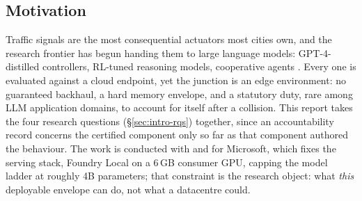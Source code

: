 \subsection{Motivation}\label{sec:intro-motivation}
Traffic signals are the most consequential actuators most cities own, and
the research frontier has begun handing them to large language models:
GPT-4-distilled controllers, RL-tuned reasoning models, cooperative agents
\cite{lai2023llmlight,wang2025trafficr1,collmlight2025}. Every one is
evaluated against a cloud endpoint, yet the junction is an edge
environment: no guaranteed backhaul, a hard memory envelope, and a
statutory duty, rare among LLM application domains, to account for itself
after a collision. This report takes the four research questions
(\S\ref{sec:intro-rqs}) together, since an accountability record concerns
the certified component only so far as that component authored the
behaviour. The work is conducted with and for Microsoft, which fixes the
serving stack, Foundry Local on a 6\,GB consumer GPU, capping the model
ladder at roughly 4B parameters; that constraint is the research object:
what \emph{this} deployable envelope can do, not what a datacentre could.
